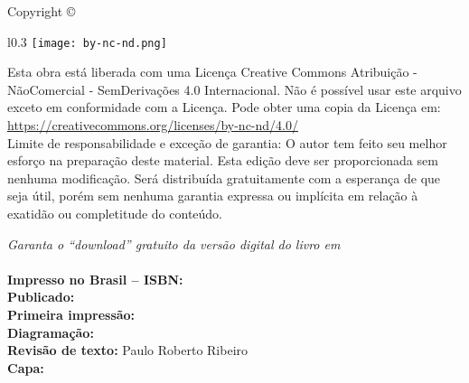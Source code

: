 
\newpage
\thispagestyle{empty}

\noindent Copyright \copyright\ \imprimiryear\ \myauthor\\ %

\begin{wrapfigure}{l}{0.3\textwidth}
\texttt{[image: by-nc-nd.png]}
\end{wrapfigure}
\noindent Esta obra está liberada com uma Licença 
Creative Commons Atribuição - NãoComercial - SemDerivações 4.0 Internacional.
Não é possível usar este arquivo exceto em conformidade com a Licença. 
Pode obter uma copia da Licença em:
\url{https://creativecommons.org/licenses/by-nc-nd/4.0/}\\ %


\noindent Limite de responsabilidade e exceção de garantia: O autor tem feito
seu melhor esforço na preparação deste material.
Esta edição deve ser proporcionada sem nenhuma modificação. 
Será distribuída gratuitamente com a esperança de que seja útil, 
porém sem nenhuma garantia expressa ou implícita em relação à exatidão ou completitude do conteúdo.

\noindent \textit{Garanta o ``download'' gratuito da versão digital do livro em \ImprimirLinkHomePageLivro}\\

~\\

\noindent \textbf{Impresso no Brasil -- ISBN:} \imprimirisbn\\ %
\noindent \textbf{Publicado:} \imprimireditora\\ %
\noindent \textbf{Primeira impressão:}  \imprimiryear\\ %
\noindent \textbf{Diagramação:} \myauthor\\ %
\noindent \textbf{Revisão de texto:} Paulo Roberto Ribeiro\\ %
\noindent \textbf{Capa:} \myauthor\\ %
~\\

\vfill

